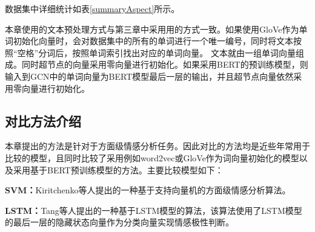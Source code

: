 数据集中详细统计如表\ref{summaryAspect}所示。
\begin{table}[htb]
	\centering
	\caption{数据集数据统计}
\end{table}

本章使用的文本预处理方式与第三章中采用用的方式一致。如果使用GloVe作为单词初始化向量时，会对数据集中的所有的单词进行一个唯一编号，同时将文本按照“空格”分词后，按照单词索引找出对应的单词向量。
文本就由一组单词向量组成。同时超节点的向量采用零向量进行初始化。如果采用BERT的预训练模型，则输入到GCN中的单词向量为BERT模型最后一层的输出，并且超节点向量依然采用零向量进行初始化。

\subsection{对比方法介绍}
本章提出的方法是针对于方面级情感分析任务。因此对比的方法均是近些年常用于比较的模型，且同时比较了采用例如word2vec或GloVe作为词向量初始化的模型以及采用基于BERT预训练模型的方法。主要比较模型如下：

\textbf{SVM：}Kiritchenko等人提出的一种基于支持向量机的方面级情感分析算法。

\textbf{LSTM：}Tang等人提出的一种基于LSTM模型的算法，该算法使用了LSTM模型的最后一层的隐藏状态向量作为分类向量实现情感极性判断。

